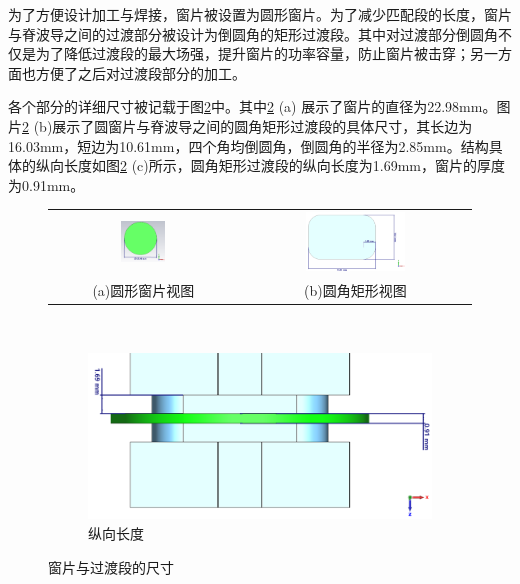 \documentclass[master]{thesis-uestc}
\begin{document}
为了方便设计加工与焊接，窗片被设置为圆形窗片。为了减少匹配段的长度，窗片与脊波导之间的过渡部分被设计为倒圆角的矩形过渡段。其中对过渡部分倒圆角不仅是为了降低过渡段的最大场强，提升窗片的功率容量，防止窗片被击穿；另一方面也方便了之后对过渡段部分的加工。

各个部分的详细尺寸被记载于图\ref{fig:窗片与过渡段的尺寸}中。其中\ref{fig:窗片与过渡段的尺寸} (a) 展示了窗片的直径为22.98mm。图片\ref{fig:窗片与过渡段的尺寸} (b)展示了圆窗片与脊波导之间的圆角矩形过渡段的具体尺寸，其长边为16.03mm，短边为10.61mm，四个角均倒圆角，倒圆角的半径为2.85mm。结构具体的纵向长度如图\ref{fig:窗片与过渡段的尺寸} (c)所示，圆角矩形过渡段的纵向长度为1.69mm，窗片的厚度为0.91mm。

\begin{figure}[!htbp]
    \small
    \centering
    \begin{tabular}{@{\ }c@{\ }c}
        \includegraphics[width=0.25\textwidth]{pic/chapter3/圆形窗片视图.png} & 
        \hspace{5pt}
        \includegraphics[width=0.45\textwidth]{pic/chapter3/圆角矩形视图.png}     \\
        \mbox{\small (a)圆形窗片视图}                                                                               & 
        \mbox{\small (b)圆角矩形视图}                                                                                  \\
    \end{tabular}
    \\[6bp]
    \begin{subfigure}[t]{0.75\linewidth}
        \setcounter{subfigure}{2}
        \centering
        \includegraphics[scale=0.21]{pic/chapter3/纵向长度视图.png}
        \caption{纵向长度}
        \label{subfig:纵向长度视图}
    \end{subfigure}
    \caption{窗片与过渡段的尺寸}
    \label{fig:窗片与过渡段的尺寸}
\end{figure}
\end{document}
